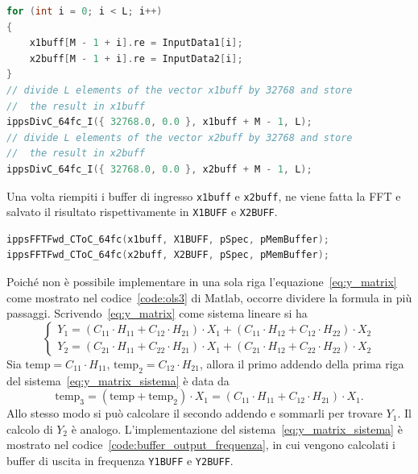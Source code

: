 \documentclass[12pt,a4paper,titlepage]{article}
\begin{document}
\begin{lstlisting}[language=cpp, label=code:buffer_C, caption = Creazione dei buffer di ingresso e normalizzazione, breaklines = false, captionpos = b]
for (int i = 0; i < L; i++)
{
	x1buff[M - 1 + i].re = InputData1[i];
	x2buff[M - 1 + i].re = InputData2[i];
}
// divide L elements of the vector x1buff by 32768 and store
//	the result in x1buff
ippsDivC_64fc_I({ 32768.0, 0.0 }, x1buff + M - 1, L);
// divide L elements of the vector x2buff by 32768 and store 
//	the result in x2buff
ippsDivC_64fc_I({ 32768.0, 0.0 }, x2buff + M - 1, L);
\end{lstlisting}
Una volta riempiti i buffer di ingresso \texttt{x1buff} e \texttt{x2buff}, ne viene fatta la FFT e salvato il risultato rispettivamente in \texttt{X1BUFF} e \texttt{X2BUFF}.
\begin{lstlisting}[language=cpp, label=code:FFT_buffer, caption = FFT dei buffer di ingresso, breaklines = false, captionpos = b]
ippsFFTFwd_CToC_64fc(x1buff, X1BUFF, pSpec, pMemBuffer);
ippsFFTFwd_CToC_64fc(x2buff, X2BUFF, pSpec, pMemBuffer);
\end{lstlisting}
Poiché non è possibile implementare in una sola riga l'equazione~\eqref{eq:y_matrix} come mostrato nel codice~\ref{code:ols3} di Matlab, occorre dividere la formula in più passaggi. Scrivendo~\eqref{eq:y_matrix} come sistema lineare si ha
\begin{equation}\label{eq:y_matrix_sistema}
\begin{cases}
Y_1 = \left( C_{11} \cdot H_{11} +  C_{12} \cdot H_{21} \right) \cdot X_1 + \left( C_{11} \cdot H_{12} +  C_{12} \cdot H_{22} \right) \cdot X_2\\
Y_2 = \left( C_{21} \cdot H_{11} +  C_{22} \cdot H_{21} \right) \cdot X_1 + \left( C_{21} \cdot H_{12} +  C_{22} \cdot H_{22} \right) \cdot X_2
\end{cases}
\end{equation}
Sia $\text{temp} = C_{11} \cdot H_{11}$, $\text{temp}_2 = C_{12} \cdot H_{21}$, allora il primo addendo della prima riga del sistema~\eqref{eq:y_matrix_sistema} è data da
\begin{equation*}
\text{temp}_3 = \left( \text{temp} +  \text{temp}_2 \right) \cdot X_1 = \left( C_{11} \cdot H_{11} +  C_{12} \cdot H_{21} \right) \cdot X_1.
\end{equation*} 
Allo stesso modo si può calcolare il secondo addendo e sommarli per trovare $Y_1$. Il calcolo di $Y_2$ è analogo. L'implementazione del sistema~\eqref{eq:y_matrix_sistema} è mostrato nel codice~\ref{code:buffer_output_frequenza}, in cui vengono calcolati i buffer di uscita in frequenza \texttt{Y1BUFF} e \texttt{Y2BUFF}.
\end{document}
